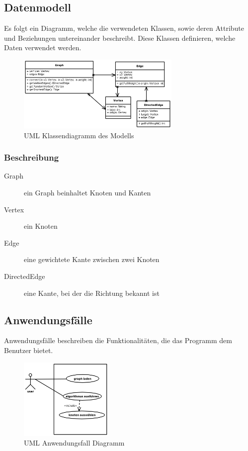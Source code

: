 \documentclass[a4paper,titlepage]{article}
\begin{document}
\clearpage

\subsection{Datenmodell}

Es folgt ein Diagramm, welche die verwendeten Klassen, sowie deren Attribute und Beziehungen untereinander beschreibt. Diese Klassen definieren, welche Daten verwendet werden.

\begin{figure}[ht]
\begin{center}
\includegraphics[width=0.7\textwidth]{model_diagram2.png}
\end{center}
\caption{UML Klassendiagramm des Modells}
\end{figure}

\subsubsection*{Beschreibung}

\begin{description}
\item[Graph] ein Graph beinhaltet Knoten und Kanten
\item[Vertex] ein Knoten
\item[Edge] eine gewichtete Kante zwischen zwei Knoten
\item[DirectedEdge] eine Kante, bei der die Richtung bekannt ist
\end{description}

\subsection{Anwendungsfälle}

Anwendungsfälle beschreiben die Funktionalitäten, die das Programm dem Benutzer bietet.

\begin{figure}[ht]
\begin{center}
\includegraphics[width=0.4\textwidth]{usecases.png}
\end{center}
\caption{UML Anwendungsfall Diagramm}
\end{figure}
\end{document}
